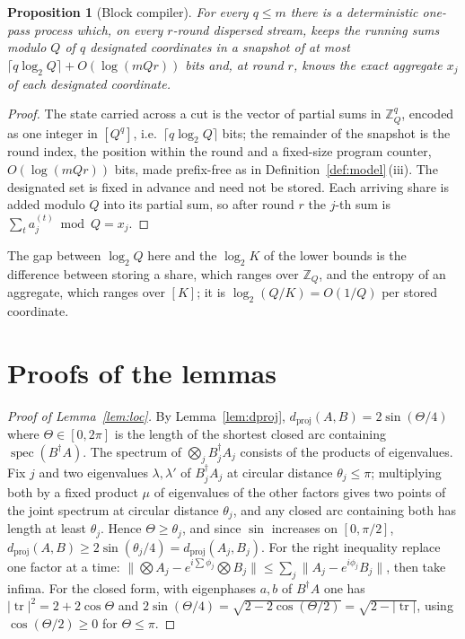\documentclass[aps,prx,twocolumn,superscriptaddress,nofootinbib,longbibliography]{revtex4-2}
\theoremstyle{plain}
\newtheorem{proposition}{Proposition}
\theoremstyle{definition}
\theoremstyle{remark}
\newcommand{\dproj}{d_{\mathrm{proj}}}
\newcommand{\Z}{\mathbb{Z}}
\newcommand{\tr}{\operatorname{tr}}
\DeclareMathOperator{\spec}{spec}
\begin{document}
\begin{proposition}[Block compiler]\label{prop:block}
For every $q\le m$ there is a deterministic one-pass process which, on every $r$-round dispersed stream, keeps the running sums modulo $Q$ of $q$ designated coordinates in a snapshot of at most $\lceil q\log_2Q\rceil+O(\log(mQr))$ bits and, at round $r$, knows the exact aggregate $x_j$ of each designated coordinate.
\end{proposition}
\begin{proof}
The state carried across a cut is the vector of partial sums in $\Z_Q^q$, encoded as one integer in $[Q^q]$, i.e.\ $\lceil q\log_2Q\rceil$ bits; the remainder of the snapshot is the round index, the position within the round and a fixed-size program counter, $O(\log(mQr))$ bits, made prefix-free as in Definition~\ref{def:model}\,(iii). The designated set is fixed in advance and need not be stored. Each arriving share is added modulo $Q$ into its partial sum, so after round $r$ the $j$-th sum is $\sum_ta^{(t)}_j\bmod Q=x_j$.
\end{proof}
The gap between $\log_2Q$ here and the $\log_2K$ of the lower bounds is the difference between storing a share, which ranges over $\Z_Q$, and the entropy of an aggregate, which ranges over $[K]$; it is $\log_2(Q/K)=O(1/Q)$ per stored coordinate.

\section{Proofs of the lemmas}\label{app:lemmas}

\begin{proof}[Proof of Lemma~\ref{lem:loc}]
By Lemma~\ref{lem:dproj}, $\dproj(A,B)=2\sin(\Theta/4)$ where $\Theta\in[0,2\pi]$ is the length of the shortest closed arc containing $\spec(B^\dagger A)$. The spectrum of $\bigotimes_jB_j^\dagger A_j$ consists of the products of eigenvalues. Fix $j$ and two eigenvalues $\lambda,\lambda'$ of $B_j^\dagger A_j$ at circular distance $\theta_j\le\pi$; multiplying both by a fixed product $\mu$ of eigenvalues of the other factors gives two points of the joint spectrum at circular distance $\theta_j$, and any closed arc containing both has length at least $\theta_j$. Hence $\Theta\ge\theta_j$, and since $\sin$ increases on $[0,\pi/2]$, $\dproj(A,B)\ge2\sin(\theta_j/4)=\dproj(A_j,B_j)$. For the right inequality replace one factor at a time: $\|\bigotimes A_j-e^{i\sum\phi_j}\bigotimes B_j\|\le\sum_j\|A_j-e^{i\phi_j}B_j\|$, then take infima. For the closed form, with eigenphases $a,b$ of $B^\dagger A$ one has $|\tr|^2=2+2\cos\Theta$ and $2\sin(\Theta/4)=\sqrt{2-2\cos(\Theta/2)}=\sqrt{2-|\tr|}$, using $\cos(\Theta/2)\ge0$ for $\Theta\le\pi$.
\end{proof}
\end{document}
